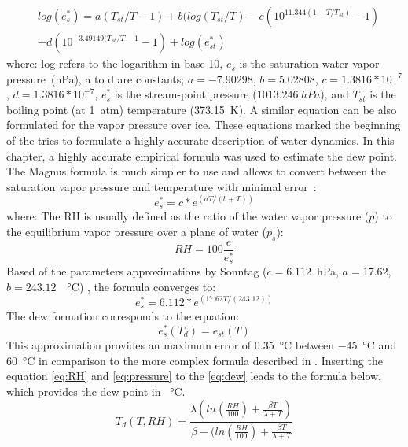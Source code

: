 \begin{equation}
\begin{split}
    &log({e}^{*}_{s}) = a(T_{st}/T - 1) + b(log(T_{st}/T) - c(10^{11.344(1-T/T_{st})} - 1) \\
    &+ d(10^{-3.49149(T_{st}/T - 1} -1) + log(e^{*}_{st})
\end{split}
\end{equation}
where: log refers to the logarithm in base 10, $e_{s}$ is the saturation water vapor pressure~(hPa), a to d are constants; $a = - 7.90298$, $b=5.02808$, $c=1.3816*10^{-7}$, $d=1.3816*10^{-7}$, $e^{*}_{s}$ is the stream-point pressure ($1013.246~hPa$), and $T_{st}$ is the boiling point (at 1~atm) temperature (373.15~K). A similar equation can be also formulated for the vapor pressure over ice. These equations marked the beginning of the tries to formulate a highly accurate description of water dynamics. In this chapter, a highly accurate empirical formula was used to estimate the dew point. The Magnus formula is much simpler to use and allows to convert between the saturation vapor pressure and temperature with minimal error~\cite{magnus}: 
\begin{equation}
    e^{*}_{s} = c*e^{(aT/(b+T))}
\end{equation}
where: 
The \gls{RH} is usually defined as the ratio of the water vapor pressure ($p$) to the equilibrium vapor pressure over a plane of water ($p_{s}$):
\begin{equation}
    RH = 100\frac{e}{e^{*}_{s}}
    \label{eq:RH}
\end{equation}
Based of the parameters approximations by Sonntag ($c=6.112$~hPa, $a=17.62$, $b=243.12$~\SI{}{\celsius}) \cite{magnus}, the formula converges to:
\begin{equation}
    e^{*}_{s} = 6.112*e^{(17.62T/(243.12))}
    \label{eq:pressure}
\end{equation}
The dew formation corresponds to the equation:
\begin{equation}
    e^{*}_{s}(T_{d}) = e_{st}(T)
    \label{eq:dew}
\end{equation}
This approximation provides an maximum error of \SI{0.35}{\celsius} between \SI{-45}{\celsius} and \SI{60}{\celsius} in comparison to the more complex formula described in \cite{hardy}. 
Inserting the equation \ref{eq:RH} and \ref{eq:pressure} to the \ref{eq:dew} leads to the formula below, which provides the dew point in \SI{}{\celsius}.
\begin{equation}
    T_{d}(T, RH) = \frac{\lambda(ln(\frac{RH}{100})+\frac{\beta T}{\lambda + T})}{\beta - (ln(\frac{RH}{100})+\frac{\beta T}{\lambda + T}}
    \label{eq:td}
\end{equation}
